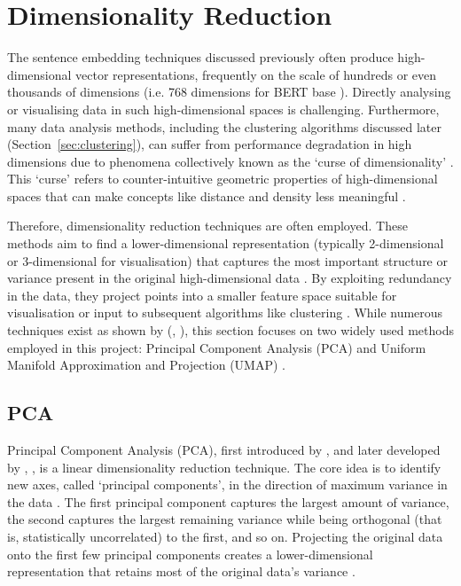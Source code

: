 \documentclass[10pt,oneside]{report}
\renewcommand{\citet}[1]{\citeauthor{#1}, \citeyear{#1}}
\begin{document}
\section{Dimensionality Reduction}\label{sec:dimred}

The sentence embedding techniques discussed previously often produce high-dimensional vector representations, frequently on the scale of hundreds or even thousands of dimensions (i.e. 768 dimensions for BERT base \cite{devlin2019bert}). Directly analysing or visualising data in such high-dimensional spaces is challenging. Furthermore, many data analysis methods, including the clustering algorithms discussed later (Section~\ref{sec:clustering}), can suffer from performance degradation in high dimensions due to phenomena collectively known as the `curse of dimensionality' \cite{verleysen2005curse, hinneburg1999optimal}. This `curse' refers to counter-intuitive geometric properties of high-dimensional spaces that can make concepts like distance and density less meaningful \cite{verleysen2005curse}.

Therefore, dimensionality reduction techniques are often employed. These methods aim to find a lower-dimensional representation (typically 2-dimensional or 3-dimensional for visualisation) that captures the most important structure or variance present in the original high-dimensional data \cite{sorzano2014survey}. By exploiting redundancy in the data, they project points into a smaller feature space suitable for visualisation or input to subsequent algorithms like clustering \cite{sorzano2014survey, hinneburg1999optimal}. While numerous techniques exist as shown by (\citet{sorzano2014survey}), this section focuses on two widely used methods employed in this project: Principal Component Analysis (PCA) \cite{pearson1901liii, hotelling1933analysis} and Uniform Manifold Approximation and Projection (UMAP) \cite{mcinnes2018umap}.

\subsection{PCA}\label{sec:pca}

Principal Component Analysis (PCA), first introduced by \citet{pearson1901liii} and later developed by \citet{hotelling1933analysis}, is a linear dimensionality reduction technique. The core idea is to identify new axes, called `principal components', in the direction of maximum variance in the data \cite{abdi2010principal}. The first principal component captures the largest amount of variance, the second captures the largest remaining variance while being orthogonal (that is, statistically uncorrelated) to the first, and so on. Projecting the original data onto the first few principal components creates a lower-dimensional representation that retains most of the original data's variance \cite{abdi2010principal}.
\end{document}
